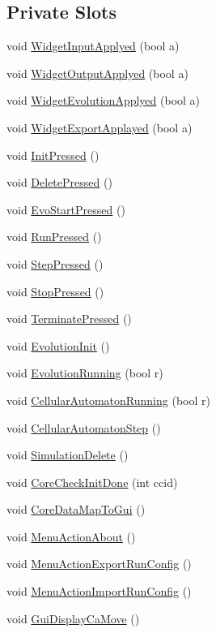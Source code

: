 \subsection*{Private Slots}
\begin{DoxyCompactItemize}
\item 
void \hyperlink{classCWindowMain_a5c044b750d1626f1d87a7ef57c573dac}{WidgetInputApplyed} (bool a)
\item 
void \hyperlink{classCWindowMain_a62085f5b2d09731bba414dac063ba30c}{WidgetOutputApplyed} (bool a)
\item 
void \hyperlink{classCWindowMain_adbaea71f7ed0bd6ad2ee1c7ee3183933}{WidgetEvolutionApplyed} (bool a)
\item 
void \hyperlink{classCWindowMain_a860e2fe5338da7007566e53382d2cf35}{WidgetExportApplayed} (bool a)
\item 
void \hyperlink{classCWindowMain_abd0c204fff950b8b26b0dc8bd7642afd}{InitPressed} ()
\item 
void \hyperlink{classCWindowMain_a88e0119155757defdea0bdaf4ce84c55}{DeletePressed} ()
\item 
void \hyperlink{classCWindowMain_ad9734902625a60d83e0d537d74865e31}{EvoStartPressed} ()
\item 
void \hyperlink{classCWindowMain_ac6aaa339ff3d4812de61092cc953c2ac}{RunPressed} ()
\item 
void \hyperlink{classCWindowMain_a13929df83f0165db58ad16c0d90fa092}{StepPressed} ()
\item 
void \hyperlink{classCWindowMain_a1c895ba39c0847fd25f6b734eb5f6ac3}{StopPressed} ()
\item 
void \hyperlink{classCWindowMain_a0664061226a46527c08baa79c77c021e}{TerminatePressed} ()
\item 
void \hyperlink{classCWindowMain_a8622a7def9276f522c5c13eeb4491612}{EvolutionInit} ()
\item 
void \hyperlink{classCWindowMain_a215d5fc27c694df1b869aa45b161d964}{EvolutionRunning} (bool r)
\item 
void \hyperlink{classCWindowMain_aba0d4bd86968982f3d61d5fbaeb946e5}{CellularAutomatonRunning} (bool r)
\item 
void \hyperlink{classCWindowMain_a80a09b310e8041ee07ffa00db45aa56a}{CellularAutomatonStep} ()
\item 
void \hyperlink{classCWindowMain_ad73f9e5ab904f02091259c478caa6ac3}{SimulationDelete} ()
\item 
void \hyperlink{classCWindowMain_a64befadac7e02a2a690e89706badd766}{CoreCheckInitDone} (int ccid)
\item 
void \hyperlink{classCWindowMain_a98613fbc73c34cbafce2990aa4585e0f}{CoreDataMapToGui} ()
\item 
void \hyperlink{classCWindowMain_abeadaf48e9588743daf80d5ddcf3ceaa}{MenuActionAbout} ()
\item 
void \hyperlink{classCWindowMain_aa07e380e77b5dbcbecc1078f6ad1c41d}{MenuActionExportRunConfig} ()
\item 
void \hyperlink{classCWindowMain_afe2b8abc28c34267f4cf7bd5c87d97eb}{MenuActionImportRunConfig} ()
\item 
void \hyperlink{classCWindowMain_a321e1a1a2653cde8054d27f4125094f4}{GuiDisplayCaMove} ()
\end{DoxyCompactItemize}
